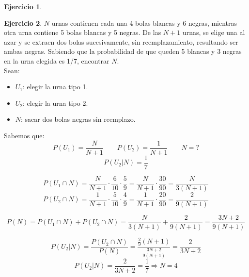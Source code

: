 \documentclass[a4paper, 12pt]{article}
\theoremstyle{definition}
\newtheorem{ej}{Ejercicio}
\begin{document}
\begin{ej}
\end{ej}

\begin{ej}
\(N\) urnas contienen cada una 4 bolas blancas y 6 negras, mientras otra urna contiene 5 bolas blancas y 5 negras. De las \(N+1\) urnas, se elige una al azar y se extraen dos bolas sucesivamente, sin reemplazamiento, resultando ser ambas negras. Sabiendo que la probabilidad de que queden 5 blancas y 3 negras en la urna elegida es 1/7, encontrar \(N\). \\

Sean:
\begin{itemize}
	\item \(U_1\): elegir la urna tipo 1.
	\item \(U_2\): elegir la urna tipo 2.
	\item \(N\): sacar dos bolas negras sin reemplazo. 
\end{itemize}

Sabemos que:
\[
	P(U_1)= \frac{N}{N + 1} \qquad P(U_2) = \frac{1}{N+1} \qquad N = ?
\]
\[
	P(U_2|N) = \frac{1}{7}
\]

\[
	P(U_1 \cap N) = \frac{N}{N + 1} \cdot \frac{6}{10} \cdot \frac{5}{9} = \frac{N}{N + 1} \cdot \frac{30}{90} = \frac{N}{3(N+1)}
\]
\[
	P(U_2 \cap N) = \frac{1}{N + 1} \cdot \frac{5}{10} \cdot \frac{4}{9} = \frac{1}{N+1} \cdot \frac{20}{90} = \frac{2}{9(N+1)}
\]

\[
	P(N) = P(U_1 \cap N) + P(U_2 \cap N) = \frac{N}{3(N+1)} + \frac{2}{9(N+1)} = \frac{3N + 2}{9(N+1)}
\]

\[
	P(U_2|N) = \frac{P(U_2 \cap N)}{P(N)} = \frac{\frac{2}{9}(N+1)}{\frac{3N + 2}{9(N+1)}} = \frac{2}{3N + 2}
\]
\[
	P(U_2|N) = \frac{2}{3N+2} = \frac{1}{7} \Rightarrow \underline{N=4}
\]
\end{ej}
\end{document}
